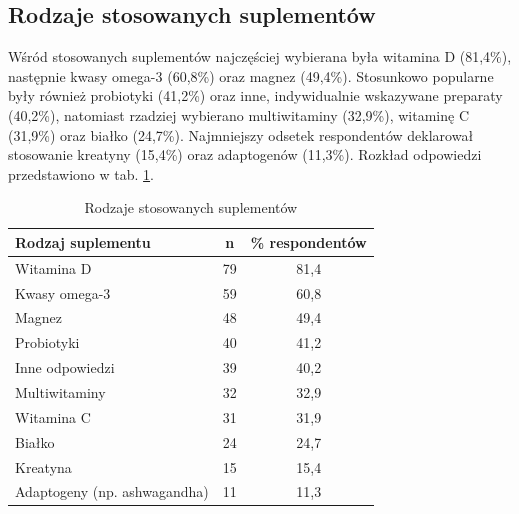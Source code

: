 




\subsection{Rodzaje stosowanych suplementów}

Wśród stosowanych suplementów najczęściej wybierana była witamina D (81,4\%), następnie kwasy omega-3 (60,8\%) oraz magnez (49,4\%). Stosunkowo popularne były również probiotyki (41,2\%) oraz inne, indywidualnie wskazywane preparaty (40,2\%), natomiast rzadziej wybierano multiwitaminy (32,9\%), witaminę C (31,9\%) oraz białko (24,7\%). Najmniejszy odsetek respondentów deklarował stosowanie kreatyny (15,4\%) oraz adaptogenów (11,3\%). Rozkład odpowiedzi przedstawiono w tab. \ref{tab:rodz-stos-supl}.


\begin{table}[H]
    \centering
    \caption{Rodzaje stosowanych suplementów}
    \label{tab:rodz-stos-supl}
    \begin{tabular}{|l|c|c|}
        \hline
        \textbf{Rodzaj suplementu} & \textbf{n} & \textbf{\% respondentów} \\
        \hline
        \hline
        Witamina D & 79 & 81,4 \\
        \hline
        Kwasy omega-3 & 59 & 60,8 \\
        \hline
        Magnez & 48 & 49,4 \\
        \hline
        Probiotyki & 40 & 41,2 \\
        \hline
        Inne odpowiedzi & 39 & 40,2 \\
        \hline
        Multiwitaminy & 32 & 32,9 \\
        \hline
        Witamina C & 31 & 31,9 \\
        \hline
        Białko & 24 & 24,7 \\
        \hline
        Kreatyna & 15 & 15,4 \\
        \hline
        Adaptogeny (np. ashwagandha) & 11 & 11,3 \\
        \hline
    \end{tabular}
\end{table}

